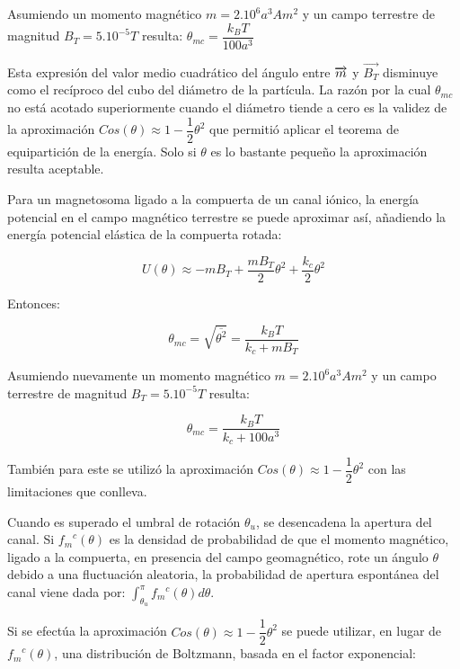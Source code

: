 Asumiendo un momento magnético $m=2.10^{6} a^{3} Am^{2}$ y un campo terrestre de magnitud $B_{T}=5.10^{−5} T$ resulta: $\theta_{mc}=\dfrac{k_{B}T}{100a^{3}}$

Esta expresión del valor medio cuadrático del ángulo entre $\overrightarrow{m}$ y $\overrightarrow{B_{T}}$ disminuye como el recíproco del cubo del diámetro de la partícula.
La razón por la cual $\theta_{mc}$ no está acotado superiormente cuando el diámetro tiende a cero es la validez de la aproximación $Cos(\theta)\approx 1-\dfrac{1}{2}\theta^{2}$ que permitió aplicar el teorema de equipartición de la energía. Solo si $\theta$ es lo bastante pequeño la aproximación resulta aceptable.

Para un magnetosoma ligado a la compuerta de un canal iónico, la energía potencial en el campo magnético terrestre se puede aproximar así, añadiendo la energía potencial elástica de la compuerta rotada: 

\begin{equation}
	\label{eq:67}
U(\theta)\approx -mB_{T} + \dfrac{mB_{T}}{2}\theta^{2}+\dfrac{k_{c}}{2}\theta^{2}
\end{equation}

Entonces: 

\begin{equation}
	\label{eq:68}
		\theta_{mc} =\sqrt{\overline{\theta^{2}}} = \dfrac{k_{B}T}{k_{c}+mB_{T}}
\end{equation}

Asumiendo nuevamente un momento magnético $m=2.10^{6} a^{3} Am^{2}$ y un campo terrestre de magnitud $B_{T}=5.10^{−5} T$ resulta:

\begin{equation}
	\label{eq:69}
		\theta_{mc} = \dfrac{k_{B}T}{k_{c}+100a^{3}}
\end{equation}


También para este se utilizó la aproximación $Cos(\theta)\approx 1-\dfrac{1}{2}\theta^{2}$ con las limitaciones que conlleva.

Cuando es superado el umbral de rotación $\theta_{u}$, se desencadena la apertura del canal. Si ${f_{m}}^{c}(\theta)$ es la densidad de probabilidad de que el momento magnético, ligado a la compuerta, en presencia del campo geomagnético, rote un ángulo $\theta$ debido a una fluctuación aleatoria, la probabilidad de apertura espontánea del canal viene dada por: $\int_{\theta_{u}}^{\pi}{f_{m}}^{c}(\theta)d\theta$.

Si se efectúa la aproximación $Cos(\theta)\approx 1-\dfrac{1}{2}\theta^{2}$ se puede utilizar, en lugar de ${f_{m}}^{c}(\theta)$, una distribución de Boltzmann, basada en el factor exponencial: 


